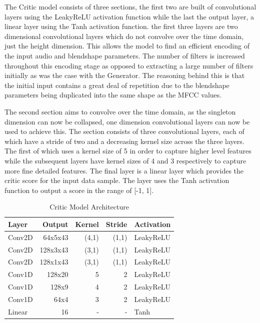 The Critic model consists of three sections, the first two are built of convolutional layers using the LeakyReLU activation function while the last the output layer, a linear layer using the Tanh activation function.
the first three layers are two dimensional convolutional layers which do not convolve over the time domain, just the height dimension.
This allows the model to find an efficient encoding of the input audio and blendshape parameters.
The number of filters is increased throughout this encoding stage as opposed to extracting a large number of filters initially as was the case with the Generator.
The reasoning behind this is that the initial input contains a great deal of repetition due to the blendshape parameters being duplicated into the same shape as the MFCC values.

The second section aims to convolve over the time domain, as the singleton dimension can now be collapsed, one dimension convolutional layers can now be used to achieve this.
The section consists of three convolutional layers, each of which have a stride of two and a decreasing kernel size across the three layers.
The first of which uses a kernel size of 5 in order to capture higher level features while the subsequent layers have kernel sizes of 4 and 3 respectively to capture more fine detailed features.
The final layer is a linear layer which provides the critic score for the input data sample.
The layer uses the Tanh activation function to output a score in the range of [-1, 1].

\begin{table}[h!]
\centering
    \begin{tabular}{ l | r | r | r | l}
    \textbf{Layer} & \textbf{Output} & \textbf{Kernel} & \textbf{Stride} & \textbf{Activation} \\ \hline
    Conv2D & 64x5x43   & (4,1) & (1,1) & LeakyReLU \\ \hline
    Conv2D & 128x3x43  & (3,1) & (1,1) & LeakyReLU \\ \hline
    Conv2D & 128x1x43  & (3,1) & (1,1) & LeakyReLU \\ \hline
    Conv1D & 128x20    & 5     & 2     & LeakyReLU \\ \hline
    Conv1D & 128x9     & 4     & 2     & LeakyReLU \\ \hline
    Conv1D & 64x4      & 3     & 2     & LeakyReLU \\ \hline
    Linear & 16        & -     & -     & Tanh      
    \end{tabular} 
    \caption{Critic Model Architecture}\label{table:gan_critic_arch}
\end{table}

